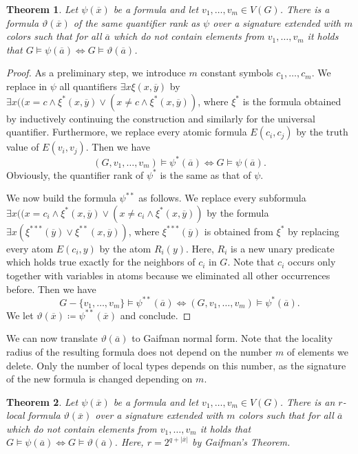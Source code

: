 \documentclass[11pt, fleqn]{article}
\theoremstyle{plain}
\newtheorem{theorem}{Theorem}
\theoremstyle{nonumberplain}
\newtheorem{proof}{Proof.}
\newcommand{\tup}[1]{\overline{#1}}
\begin{document}
\begin{theorem}
Let $\psi(\tup{x})$ be a formula and let $v_1,\ldots, v_m\in V(G)$. 
There is a formula $\vartheta(\tup{x})$ 
of the same quantifier rank as $\psi$ over a signature extended 
with $m$ colors such that for all $\tup{a}$ which do not
contain elements from $v_1,\ldots, v_m$ it holds that
$G\models\psi(\tup{a})\Leftrightarrow G\models\vartheta(\tup{a})$. 
\end{theorem}
\begin{proof}
As a preliminary step, we introduce $m$ constant symbols 
$c_1,\ldots, c_m$. We replace in $\psi$ all quantifiers 
$\exists x\xi(x,\tup{y})$ by $\exists x((x=c \wedge \xi^*(x,\tup{y})
\vee (x\neq c\wedge \xi^*(x,\tup{y}))$, 
where $\xi^*$ is the formula obtained by inductively continuing the
construction and similarly for the universal quantifier. Furthermore, 
we replace every atomic formula $E(c_i,c_j)$ by the truth value of
$E(v_i,v_j)$. Then we have
\[(G,v_1,\ldots, v_m)\models\psi^*(\tup{a})\Leftrightarrow G\models\psi(\tup{a}).\]
Obviously, the quantifier rank of $\psi^*$ is the same as that of $\psi$. 

We now build the formula $\psi^{**}$ as follows. We replace
every subformula $\exists x((x=c_i \wedge \xi^*(x,\tup{y}) \vee 
(x\neq c_i \wedge \xi^*(x,\tup{y}))$ by the formula
$\exists x(\xi^{***}(\tup{y}) \vee \xi^{**}(x,\tup{y}))$, 
where $\xi^{***}(\tup{y})$ is obtained from $\xi^{*}$ by
replacing every atom $E(c_i,y)$ by the atom $R_i(y)$. Here, 
$R_i$ is a new unary predicate which holds true exactly for 
the neighbors of $c_i$ in $G$. Note that $c_i$ occurs only together
with variables in atoms because we eliminated all other occurrences
before. Then we have 
\[G-\{v_1,\ldots, v_m\}\models \psi^{**}(\tup{a})
\Leftrightarrow (G,v_1,\ldots, v_m)\models\psi^*(\tup{a}).\]
We let $\vartheta(\tup{x})\coloneqq \psi^{**}(\tup{x})$ and conclude. 
\end{proof}

We can now translate $\vartheta(\tup{a})$ to Gaifman normal form. 
Note that the locality radius of the resulting formula does not depend
on the number $m$ of elements we delete. Only the number of local types
depends on this number, as the signature of the new formula is changed
depending on $m$. 

\begin{theorem}
Let $\psi(\tup{x})$ be a formula and let $v_1,\ldots, v_m\in V(G)$. 
There is an $r$-local formula $\vartheta(\tup{x})$ 
over a signature extended 
with $m$ colors such that for all $\tup{a}$ which do not
contain elements from $v_1,\ldots, v_m$ it holds that
$G\models\psi(\tup{a})\Leftrightarrow G\models\vartheta(\tup{a})$. 
Here, $r=2^{q+|\tup{x}|}$ by Gaifman's Theorem.
\end{theorem}
\end{document}
